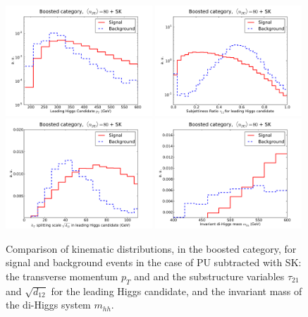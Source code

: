 \begin{figure}[t]
  \begin{center}
  \includegraphics[width=0.49\textwidth]{plots/pt_h0_bst_comp_back.pdf}
   \includegraphics[width=0.49\textwidth]{plots/tau21_h1_bst_comp_back.pdf}
   \includegraphics[width=0.49\textwidth]{plots/split12_h0_bst_comp_back.pdf}
   \includegraphics[width=0.49\textwidth]{plots/m_h0_bst_comp_back.pdf}
   \caption{\small
     Comparison of kinematic distributions, in
     the boosted category, for signal and background events
    in the case of PU subtracted with SK:
     the transverse momentum  $p_T$ and
     and the substructure variables $\tau_{21}$ and $\sqrt{d_{12}}$
     for the leading Higgs candidate, and the invariant
     mass of the di-Higgs system $m_{hh}$.
 }
\label{fig:signal-vs-back-boosted}
\end{center}
\end{figure}



